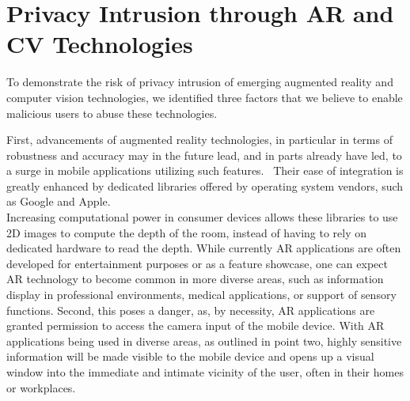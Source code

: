 
\section{Privacy Intrusion through AR and CV Technologies}

To demonstrate the risk of privacy intrusion of emerging augmented reality and computer vision technologies, we identified three factors that we believe to enable malicious users to abuse these technologies.

First, advancements of augmented reality technologies, in particular in terms of robustness and accuracy may in the future lead, and in parts already have led, to a surge in mobile applications utilizing such features.~\cite{HCI-049}
Their ease of integration is greatly enhanced by dedicated libraries offered by operating system vendors, such as Google and Apple.\\
Increasing computational power in consumer devices allows these libraries to use 2D images to compute the depth of the room, instead of having to rely on dedicated hardware to read the depth.
While currently AR applications are often developed for entertainment purposes or as a feature showcase, one can expect AR technology to become common in more diverse areas, such as information display in professional environments, medical applications, or support of sensory functions.
Second, this poses a danger, as, by necessity, AR applications are granted permission to access the camera input of the mobile device.
With AR applications being used in diverse areas, as outlined in point two, highly sensitive information will be made visible to the mobile device and opens up a visual window into the immediate and intimate vicinity of the user, often in their homes or workplaces.\\
